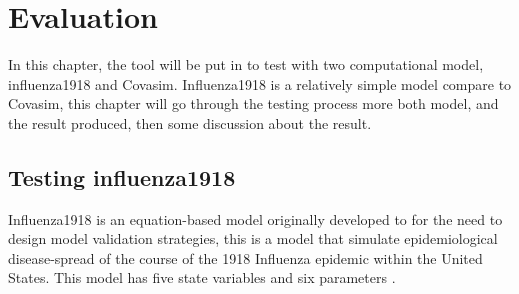 \chapter{Evaluation}
In this chapter, the tool will be put in to test with two computational model, influenza1918 and Covasim. Influenza1918 is a relatively simple model compare to Covasim, this chapter will go through the testing process more both model, and the result produced, then some discussion about the result.
\section{Testing influenza1918}
Influenza1918 is an equation-based model originally developed to for the need to design model validation strategies, this is a model that simulate epidemiological disease-spread of the course of the 1918 Influenza epidemic within the United States.
This model has five state variables and six parameters \cite{Reference24}.
